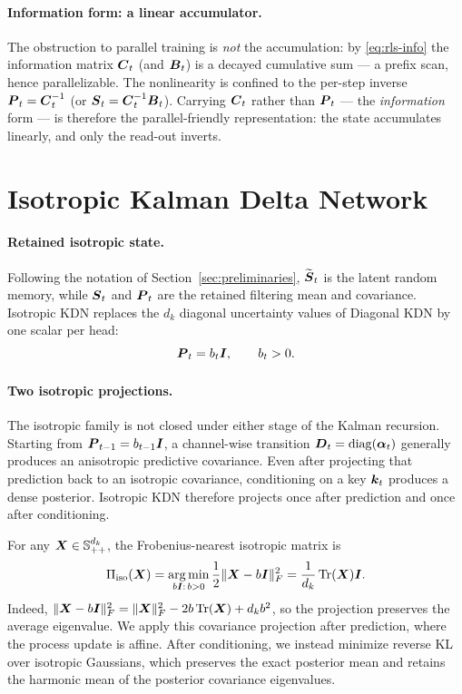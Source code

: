 \documentclass{article} %
\begin{document}
\paragraph{Information form: a linear accumulator.}
The obstruction to parallel training is \emph{not} the accumulation: by \eqref{eq:rls-info}
the information matrix $\boldsymbol{C}_t$ (and $\boldsymbol{B}_t$) is a decayed cumulative sum --- a prefix scan, hence
parallelizable. The nonlinearity is confined to the per-step inverse $\boldsymbol{P}_t=\boldsymbol{C}_t^{-1}$ (or
$\boldsymbol{S}_t=\boldsymbol{C}_t^{-1}\boldsymbol{B}_t$). Carrying $\boldsymbol{C}_t$ rather than $\boldsymbol{P}_t$ --- the \emph{information} form --- is
therefore the parallel-friendly representation: the state accumulates linearly, and only the
read-out inverts.
\fi

\section{Isotropic Kalman Delta Network}
\label{app:iso-kla}

\paragraph{Retained isotropic state.}
Following the notation of Section~\ref{sec:preliminaries},
$\widetilde{\boldsymbol{S}}_t$ is the latent random memory, while $\boldsymbol{S}_t$ and $\boldsymbol{P}_t$ are the retained
filtering mean and covariance. Isotropic KDN replaces the $d_k$ diagonal uncertainty values of
Diagonal KDN by one scalar per head:
\begin{equation}
  \boldsymbol{P}_t=b_t\boldsymbol{I},
  \qquad
  b_t>0.
  \label{eq:iso-cov-family}
\end{equation}

\paragraph{Two isotropic projections.}
The isotropic family is not closed under either stage of the Kalman recursion. Starting from
$\boldsymbol{P}_{t-1}=b_{t-1}\boldsymbol{I}$, a channel-wise transition
$\boldsymbol{D}_t=\operatorname{diag}(\boldsymbol{\alpha}_t)$ generally produces an anisotropic predictive covariance. Even
after projecting that prediction back to an isotropic covariance, conditioning on a key
$\boldsymbol{k}_t$ produces a dense posterior. Isotropic KDN therefore projects once after prediction and
once after conditioning.

For any $\boldsymbol{X}\in\mathbb{S}_{++}^{d_k}$, the Frobenius-nearest isotropic matrix is
\begin{equation}
  \Pi_{\mathrm{iso}}(\boldsymbol{X})
  =\operatorname*{arg\,min}_{b\boldsymbol{I}:\,b>0}\frac12\|\boldsymbol{X}-b\boldsymbol{I}\|_F^2
  =\frac{1}{d_k}\operatorname{Tr}(\boldsymbol{X})\boldsymbol{I}.
  \label{eq:iso-trace-projection}
\end{equation}
Indeed,
$\|\boldsymbol{X}-b\boldsymbol{I}\|_F^2
=\|\boldsymbol{X}\|_F^2-2b\operatorname{Tr}(\boldsymbol{X})+d_kb^2$, so the projection preserves the average eigenvalue. We
apply this covariance projection after prediction, where the process update is affine. After
conditioning, we instead minimize reverse KL over isotropic Gaussians, which preserves the exact
posterior mean and retains the harmonic mean of the posterior covariance eigenvalues.
\end{document}
